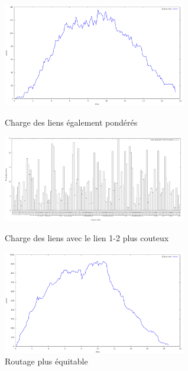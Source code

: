 \documentclass[
10pt, %
a4paper, %
oneside, %
headinclude,footinclude, %
BCOR5mm, %
]{scrartcl}
\begin{document}
\begin{figure}[top]
\centering
\parbox{8cm}{
\includegraphics[width=8cm]{png/router3.png}
\caption{Charge des liens également pondérés}
\label{Fair}}
\qquad
\begin{minipage}{8cm}
\includegraphics[width=8cm]{png/delay.png}
\caption{Charge des liens avec le lien 1-2 plus couteux}
\label{Unfair}
\end{minipage}
\begin{minipage}{8cm}
\includegraphics[width=8cm]{png/router20.png}
\caption{Routage plus équitable}
\label{Eq}
\end{minipage}
\end{figure}
\end{document}
